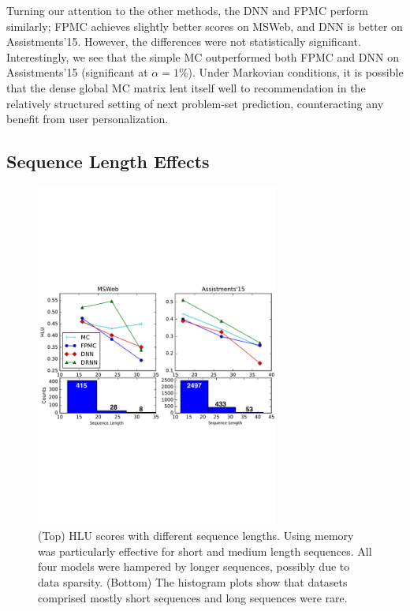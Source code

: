 \documentclass{sig-alternate-05-2015}
\begin{document}
Turning our attention to the other methods, the DNN and FPMC perform similarly; FPMC achieves slightly better scores on MSWeb, and DNN is better on Assistments'15. However, the differences were not statistically significant. Interestingly, we see that the simple MC outperformed both FPMC and DNN on Assistments'15 (significant at $\alpha = 1\%$). Under Markovian conditions, it is possible that the dense  global MC matrix lent itself well to recommendation in the relatively structured setting of next problem-set prediction, counteracting any benefit from user personalization. %

\subsection{Sequence Length Effects}
\begin{figure}
\centering
\includegraphics[width=8cm]{images/SeqLenPerfAnnotated}		
\caption{(Top) HLU scores with different sequence lengths. Using memory was particularly effective for short and medium length sequences. All four models were hampered by longer sequences, possibly due to data sparsity.  (Bottom) The histogram plots show that datasets comprised mostly short sequences and long sequences were rare.}
\label{fig:SeqLenResults}
\end{figure}
\end{document}
